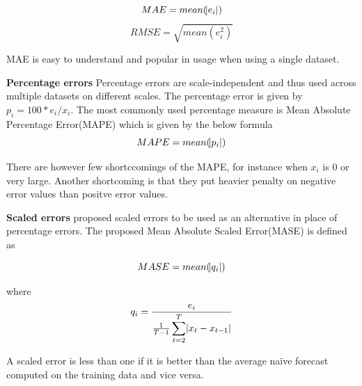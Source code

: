     \begin{equation}
        MAE = mean(\abs{e_{i}})
    \end{equation}
    \begin{equation}
        RMSE = \sqrt{mean(e^{2}_{i})}
    \end{equation}

MAE is easy to understand and popular in usage when using a single dataset.

\textbf{Percentage errors}
Percentage errors are scale-independent and thus used across multiple datasets on different
scales. The percentage error is given by $p_{i} = 100*e_{i}/x_{i}$. The most commonly used
percentage measure is Mean Absolute Percentage Error(MAPE) which is given by the below formula
    \begin{equation}
        MAPE = mean(\abs{p_{i}})
    \end{equation}

There are however few shortccomings of the MAPE, for instance when $x_{i}$ is 0 or very large.
Another shortcoming is that they put heavier penalty on negative error values than positve error
values.

\textbf{Scaled errors}
\citet{hyndman2006another} proposed scaled errors to be used as an alternative in place of
percentage errors. The proposed Mean Absolute Scaled Error(MASE) is defined as

    \begin{equation}
        MASE = mean(\abs{q_{i}})
    \end{equation}

where
    \begin{equation}
        q_{i} = \frac{e_{i}}{\frac{1}{T-1} \displaystyle\sum_{t=2}^{T}\abs{x_{t} - x_{t-1}}}
    \end{equation}

A scaled error is less than one if it is better than the average naïve forecast computed on the
training data and vice versa.


